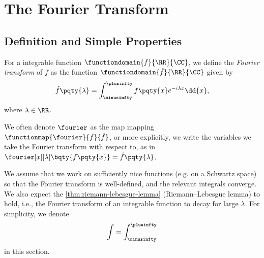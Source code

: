 \section{The Fourier Transform}
\subsection{Definition and Simple Properties}

\begin{definition}
    For a integrable function \(\functiondomain{f}{\RR}{\CC}\), we define the \emph{Fourier transform} of \(f\) as the function \(\functiondomain{\hat{f}}{\RR}{\CC}\) given by
    \begin{equation}
        \hat{f}\pqty{\lambda} = \int_{\minusinfty}^{\plusinfty} f\pqty{x} e^{-i \lambda x} \dd{x},
    \end{equation}
    where \(\lambda \in \RR\).
\end{definition}

We often denote \(\fourier\) as the map mapping \(\functionmap{\fourier}{f}{\hat{f}}\), or more explicitly, we write the variables we take the Fourier transform with respect to, as in \(\fourier[x][\lambda] \bqty{f\pqty{x}} = \hat{f}\pqty{\lambda}\).

We assume that we work on sufficiently nice functions (e.g. on a Schwartz space) so that the Fourier transform is well-defined, and the relevant integrals converge. We also expect the \autoref{thm:riemann-lebesgue-lemma} (Riemann--Lebesgue lemma) to hold, i.e., the Fourier transform of an integrable function to decay for large \(\lambda\). For simplicity, we denote
\begin{equation}
    \int = \int_{\minusinfty}^{\plusinfty}
\end{equation}
in this section.

